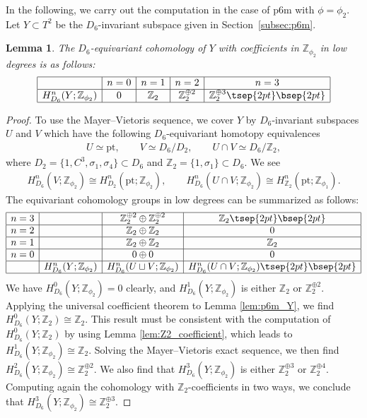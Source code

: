 \documentclass[pdftex]{sigma}
\newtheorem{lem}[thm]{Lemma}
\theoremstyle{definition}
\newcommand{\Z}{\mathbb{Z}}
\newcommand{\pt}{\mathrm{pt}}
\begin{document}
In the following, we carry out the computation in the case of \textsf{p6m} with $\phi = \phi_2$. Let $Y \subset T^2$ be the $D_6$-invariant subspace given in Section~\ref{subsec:p6m}.

\begin{lem}
The $D_6$-equivariant cohomology of $Y$ with coefficients in $\Z_{\phi_2}$ in low degrees is as follows:
$$
\begin{array}{|c|c|c|c|c|}
\hline
 & n = 0 & n = 1 & n = 2 & n = 3 \\
\hline
H^n_{D_6}(Y; \Z_{\phi_2}) & 0 & \Z_2 & \Z_2^{\oplus 2} & \Z_2^{\oplus 3} \tsep{2pt}\bsep{2pt}\\
\hline
\end{array}
$$
\end{lem}

\begin{proof}
To use the Mayer--Vietoris sequence, we cover $Y$ by $D_6$-invariant subspaces $U$ and $V$ which have the following $D_6$-equivariant homotopy equivalences
\begin{gather*}
U \simeq \pt, \qquad V \simeq D_6/D_2, \qquad U \cap V \simeq D_6/\Z_2,
\end{gather*}
where $D_2 = \{ 1, C^3, \sigma_1, \sigma_4 \} \subset D_6$ and $\Z_2 = \{ 1, \sigma_1 \} \subset D_6$. We see
\begin{gather*}
H^n_{D_6}(V; \Z_{\phi_2}) \cong H^n_{D_2}(\pt; \Z_{\phi_2}), \qquad
H^n_{D_6}(U \cap V; \Z_{\phi_2}) \cong H^n_{\Z_2}(\pt; \Z_{\phi_1}).
\end{gather*}
The equivariant cohomology groups in low degrees can be summarized as follows:
$$
\begin{array}{|c|c|c|c|}
\hline
n = 3 & & \Z_2^{\oplus 2} \oplus \Z_2^{\oplus 2} & \Z_2 \tsep{2pt}\bsep{2pt}\\
\hline
n = 2 & & \Z_2 \oplus \Z_2 & 0 \\
\hline
n = 1 & & \Z_2 \oplus \Z_2 & \Z_2 \\
\hline
n = 0 & & 0 \oplus 0 & 0 \\
\hline
& H^n_{D_6}(Y; \Z_{\phi_2}) & H^n_{D_6}(U \sqcup V; \Z_{\phi_2}) &
H^n_{D_6}(U \cap V; \Z_{\phi_2})\tsep{2pt}\bsep{2pt}\\
\hline
\end{array}
$$
We have $H^0_{D_6}(Y; \Z_{\phi_2}) = 0$ clearly, and $H^1_{D_6}(Y; \Z_{\phi_2})$ is either $\Z_2$ or $\Z_2^{\oplus 2}$. Applying the universal coef\/f\/icient theorem to Lemma \ref{lem:p6m_Y}, we f\/ind $H^0_{D_6}(Y; \Z_2) \cong \Z_2$. This result must be consistent with the computation of $H^0_{D_6}(Y; \Z_2)$ by using Lemma \ref{lem:Z2_coefficient}, which leads to $H^1_{D_6}(Y; \Z_{\phi_2}) \cong \Z_2$. Solving the Mayer--Vietoris exact sequence, we then f\/ind $H^2_{D_6}(Y; \Z_{\phi_2}) \cong \Z_2^{\oplus 2}$. We also f\/ind that $H^3_{D_6}(Y; \Z_{\phi_2})$ is either $\Z_2^{\oplus 3}$ or $\Z_2^{\oplus 4}$. Computing again the cohomology with $\Z_2$-coef\/f\/icients in two ways, we conclude that $H^3_{D_6}(Y; \Z_{\phi_2}) \cong \Z_2^{\oplus 3}$.
\end{proof}
\end{document}
